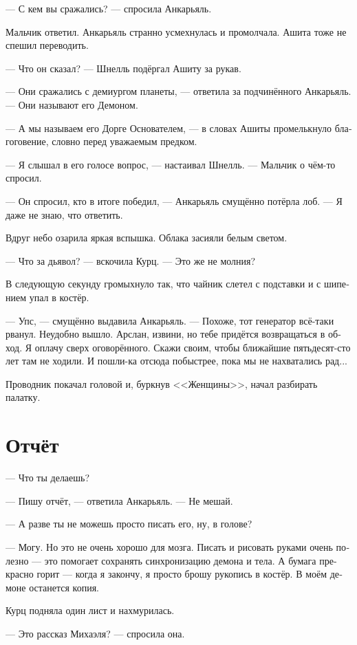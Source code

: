 \documentclass[a4paper,12pt,fleqn]{book}\usepackage{polyglossia}\setdefaultlanguage[babelshorthands=true]{russian}\setotherlanguage{english}\defaultfontfeatures{Ligatures=TeX,Mapping=tex-text}\usepackage{xcolor}\newcommand{\ml}[3]{#2}
\begin{document}
--- С кем вы сражались? --- спросила Анкарьяль.

Мальчик ответил.
Анкарьяль странно усмехнулась и промолчала.
Ашита тоже не спешил переводить.

--- Что он сказал? --- Шнелль подёргал Ашиту за рукав.

--- Они сражались с демиургом планеты, --- ответила за подчинённого Анкарьяль.
--- Они называют его Демоном.

--- А мы называем его Дорге Основателем, --- в словах Ашиты промелькнуло благоговение, словно перед уважаемым предком.

--- Я слышал в его голосе вопрос, --- настаивал Шнелль.
--- Мальчик о чём-то спросил.

--- Он спросил, кто в итоге победил, --- Анкарьяль смущённо потёрла лоб.
--- Я даже не знаю, что ответить.

Вдруг небо озарила яркая вспышка.
Облака засияли белым светом.

--- Что за дьявол? --- вскочила Курц.
--- Это же не молния?

В следующую секунду громыхнуло так, что чайник слетел с подставки и с шипением упал в костёр.

--- Упс, --- смущённо выдавила Анкарьяль.
--- Похоже, тот генератор всё-таки рванул.
Неудобно вышло.
Арслан, извини, но тебе придётся возвращаться в обход.
Я оплачу сверх оговорённого.
Скажи своим, чтобы ближайшие пятьдесят-сто лет там не ходили.
И пошли-ка отсюда побыстрее, пока мы не нахватались рад...

Проводник покачал головой и, буркнув <<Женщины>>, начал разбирать палатку.

\section{Отчёт}

--- Что ты делаешь?

--- Пишу отчёт, --- ответила Анкарьяль.
--- Не мешай.

--- А разве ты не можешь просто писать его, ну, в голове?

--- Могу.
Но это не очень хорошо для мозга.
Писать и рисовать руками очень полезно --- это помогает сохранять синхронизацию демона и тела.
А бумага прекрасно горит --- когда я закончу, я просто брошу рукопись в костёр.
В моём демоне останется копия.

Курц подняла один лист и нахмурилась.

--- Это рассказ Михаэля? --- спросила она.
\end{document}
